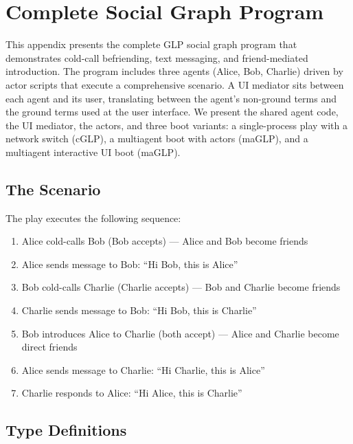 \section{Complete Social Graph Program}
\label{appendix:social-graph-complete}

This appendix presents the complete GLP social graph program that demonstrates cold-call befriending, text messaging, and friend-mediated introduction. The program includes three agents (Alice, Bob, Charlie) driven by actor scripts that execute a comprehensive scenario. A UI mediator sits between each agent and its user, translating between the agent's non-ground terms and the ground terms used at the user interface. We present the shared agent code, the UI mediator, the actors, and three boot variants: a single-process play with a network switch (cGLP), a multiagent boot with actors (maGLP), and a multiagent interactive UI boot (maGLP).

\subsection{The Scenario}
\label{app:scenario}

The play executes the following sequence:
\begin{enumerate}
\item Alice cold-calls Bob (Bob accepts) --- Alice and Bob become friends
\item Alice sends message to Bob: ``Hi Bob, this is Alice''
\item Bob cold-calls Charlie (Charlie accepts) --- Bob and Charlie become friends
\item Charlie sends message to Bob: ``Hi Bob, this is Charlie''
\item Bob introduces Alice to Charlie (both accept) --- Alice and Charlie become direct friends
\item Alice sends message to Charlie: ``Hi Charlie, this is Alice''
\item Charlie responds to Alice: ``Hi Alice, this is Charlie''
\end{enumerate}

\subsection{Type Definitions}
\label{app:types}

